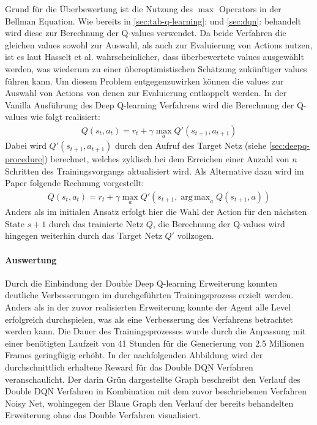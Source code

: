 \documentclass[11pt]{scrartcl}
\DeclareMathOperator*{\argmax}{arg\,max}
\begin{document}
Grund für die Überbewertung ist die Nutzung des $\max$ Operators in der Bellman Equation.
Wie bereits in \autoref{sec:tab-q-learning}: und \autoref{sec:dqn}:
 behandelt wird diese zur Berechnung der Q-values verwendet. Da beide
Verfahren die gleichen values sowohl zur Auswahl, als auch zur Evaluierung von Actions nutzen,
ist es laut Hasselt et al.\cite[~S.2]{HGD2015} wahrscheinlicher, dass überbewertete values
ausgewählt werden, was wiederum zu einer überoptimistischen Schätzung zu\-künf\-ti\-ger values
führen kann. Um diesem Problem entgegenzuwirken können die values zur Auswahl von Actions von
denen zur Evaluierung entkoppelt werden. In der Vanilla Ausführung des Deep Q-learning
Verfahrens wird die Berechnung der Q-values wie folgt realisiert:
\begin{align}
Q(s_t, a_t) = r_t + \gamma\max_{a}Q'(s_{t+1},a_{t+1})
\label{aln:double-dqn-q-values}
\end{align}
Dabei wird $Q'(s_{t+1}, a_{t+1})$ durch den Aufruf des Target Netz (siehe 
\autoref{sec:deepq-procedure}) berechnet, welches zyklisch bei dem Erreichen einer Anzahl von
$n$ Schritten des Trainingsvorgangs aktualisiert wird. Als Alternative dazu wird im Paper
folgende Rechnung vorgestellt:
\begin{align}
Q(s_t, a_t) = r_t + \gamma\max_{a}Q'(s_{t+1},\argmax_{a}Q(s_{t+1},a))
\label{aln:double-dqn-q-values-improved}
\end{align}
Anders als im initialen Ansatz erfolgt hier die Wahl der Action für den nächsten State $s+1$
durch das trainierte Netz $Q$, die Berechnung der Q-values wird hingegen weiterhin durch das
Target Netz $Q'$ vollzogen.

\paragraph*{Auswertung}
\noindent
\newline
Durch die Einbindung der Double Deep Q-learning Erweiterung konnten deutliche
Verbesserungen im durchgeführten Trainingsprozess erzielt werden. Anders als in der zuvor
realisierten Erweiterung konnte der Agent alle Level erfolgreich durchspielen, was als
eine Verbesserung des Verfahrens betrachtet werden kann. Die Dauer des Trainingsprozesses
wurde durch die Anpassung mit einer benötigten Laufzeit von 41 Stunden für die Generierung
von 2.5 Millionen Frames geringfügig erhöht. In der nachfolgenden Abbildung wird der
durchschnittlich erhaltene Reward für das Double DQN Verfahren veranschaulicht. Der darin
Grün dargestellte Graph beschreibt den Verlauf des Double DQN Verfahren in Kombination
mit dem zuvor beschriebenen Verfahren Noisy Net, wohingegen der Blaue Graph den Verlauf
der bereits behandelten Erweiterung ohne das Double Verfahren visualisiert.
\end{document}
